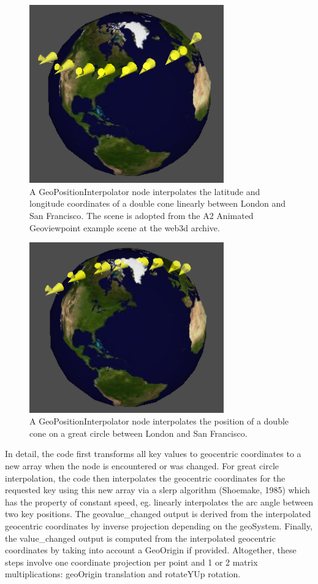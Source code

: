 \documentclass{acmsiggraph}                     %
\begin{document}
\begin{figure}[htbp]
\centering
\includegraphics[width=3.3in]{GeoPositionInterpolator1.png}
\caption{A GeoPositionInterpolator node interpolates the latitude and longitude coordinates of a double cone linearly between London and San Francisco. The scene is adopted from the A2 Animated Geoviewpoint example scene at the web3d archive.}
\label{fig:GeoPositionInterpolator1.png}
\end{figure}

\begin{figure}[htbp]
\centering
\includegraphics[width=3.3in]{GeoPositionInterpolator2.png}
\caption{A GeoPositionInterpolator node interpolates the position of a double cone on a great circle between London and San Francisco.}
\label{fig:GeoPositionInterpolator2.png}
\end{figure}

In detail, the code first transforms all key values to geocentric coordinates to a new array when the node is encountered or was changed.  For great circle interpolation, the code then interpolates the geocentric coordinates for the requested key using this new array via a slerp algorithm (Shoemake, 1985) which has the property of constant speed, eg. linearly interpolates the arc angle between two key positions. The geovalue\_changed output is derived from the interpolated geocentric coordinates by inverse projection depending on the geoSystem. Finally, the  value\_changed output is computed from the interpolated geocentric coordinates by taking into account a GeoOrigin if provided. Altogether, these steps involve one coordinate projection per point and 1 or 2 matrix multiplications: geoOrigin translation and rotateYUp rotation.
\end{document}
